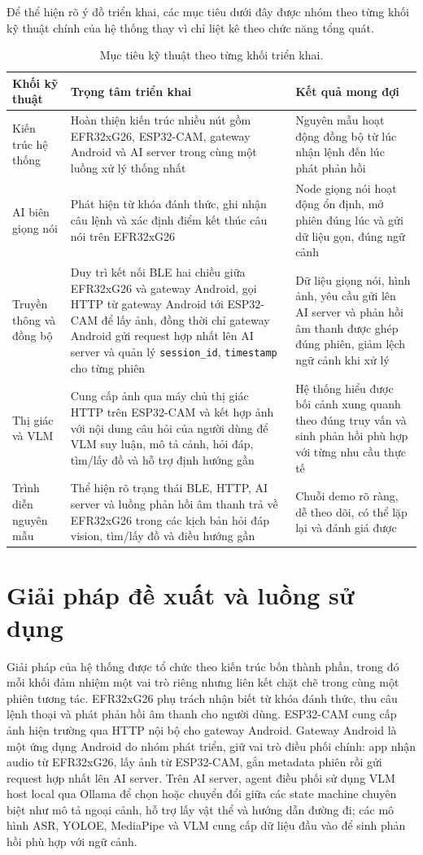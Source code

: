 \documentclass[11pt,a4paper]{article}
\begin{document}
Để thể hiện rõ ý đồ triển khai, các mục tiêu dưới đây được nhóm theo từng khối kỹ thuật chính của hệ thống thay vì chỉ liệt kê theo chức năng tổng quát.

\begin{table}[H]
\centering
\caption{Mục tiêu kỹ thuật theo từng khối triển khai.}
\begin{tabularx}{\textwidth}{p{3.1cm}Y Y}
\toprule
\textbf{Khối kỹ thuật} & \textbf{Trọng tâm triển khai} & \textbf{Kết quả mong đợi} \\
\midrule
Kiến trúc hệ thống & Hoàn thiện kiến trúc nhiều nút gồm EFR32xG26, ESP32-CAM, gateway Android và AI server trong cùng một luồng xử lý thống nhất & Nguyên mẫu hoạt động đồng bộ từ lúc nhận lệnh đến lúc phát phản hồi  \\
AI biên giọng nói & Phát hiện từ khóa đánh thức, ghi nhận câu lệnh và xác định điểm kết thúc câu nói trên EFR32xG26 & Node giọng nói hoạt động ổn định, mở phiên đúng lúc và gửi dữ liệu gọn, đúng ngữ cảnh  \\
Truyền thông và đồng bộ & Duy trì kết nối BLE hai chiều giữa EFR32xG26 và gateway Android, gọi HTTP từ gateway Android tới ESP32-CAM để lấy ảnh, đồng thời chỉ gateway Android gửi request hợp nhất lên AI server và quản lý \texttt{session\_id}, \texttt{timestamp} cho từng phiên & Dữ liệu giọng nói, hình ảnh, yêu cầu gửi lên AI server và phản hồi âm thanh được ghép đúng phiên, giảm lệch ngữ cảnh khi xử lý  \\
Thị giác và VLM & Cung cấp ảnh qua máy chủ thị giác HTTP trên ESP32-CAM và kết hợp ảnh với nội dung câu hỏi của người dùng để VLM suy luận, mô tả cảnh, hỏi đáp, tìm/lấy đồ và hỗ trợ định hướng gần & Hệ thống hiểu được bối cảnh xung quanh theo đúng truy vấn và sinh phản hồi phù hợp với từng nhu cầu thực tế  \\
Trình diễn nguyên mẫu & Thể hiện rõ trạng thái BLE, HTTP, AI server và luồng phản hồi âm thanh trả về EFR32xG26 trong các kịch bản hỏi đáp vision, tìm/lấy đồ và điều hướng gần & Chuỗi demo rõ ràng, dễ theo dõi, có thể lặp lại và đánh giá được  \\
\bottomrule
\end{tabularx}
\end{table}

\section{Giải pháp đề xuất và luồng sử dụng}
Giải pháp của hệ thống được tổ chức theo kiến trúc bốn thành phần, trong đó mỗi khối đảm nhiệm một vai trò riêng nhưng liên kết chặt chẽ trong cùng một phiên tương tác. EFR32xG26 phụ trách nhận biết từ khóa đánh thức, thu câu lệnh thoại và phát phản hồi âm thanh cho người dùng. ESP32-CAM cung cấp ảnh hiện trường qua HTTP nội bộ cho gateway Android. Gateway Android là một ứng dụng Android do nhóm phát triển, giữ vai trò điều phối chính: app nhận audio từ EFR32xG26, lấy ảnh từ ESP32-CAM, gắn metadata phiên rồi gửi request hợp nhất lên AI server. Trên AI server, agent điều phối sử dụng VLM host local qua Ollama để chọn hoặc chuyển đổi giữa các state machine chuyên biệt như mô tả ngoại cảnh, hỗ trợ lấy vật thể và hướng dẫn đường đi; các mô hình ASR, YOLOE, MediaPipe và VLM cung cấp dữ liệu đầu vào để sinh phản hồi phù hợp với ngữ cảnh.
\end{document}
